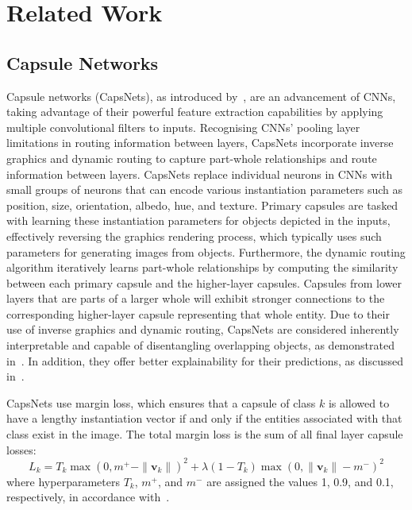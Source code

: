 \section{Related Work}
\label{sec2}

\subsection{Capsule Networks}
Capsule networks (CapsNets), as introduced by~\cite{sabour-2017}, are an advancement of CNNs, taking advantage of their powerful feature extraction capabilities by applying multiple convolutional filters to inputs. Recognising CNNs' pooling layer limitations in routing information between layers, CapsNets incorporate inverse graphics and dynamic routing to capture part-whole relationships and route information between layers. CapsNets replace individual neurons in CNNs with small groups of neurons that can encode various instantiation parameters such as position, size, orientation, albedo, hue, and texture. Primary capsules are tasked with learning these instantiation parameters for objects depicted in the inputs, effectively reversing the graphics rendering process, which typically uses such parameters for generating images from objects. Furthermore, the dynamic routing algorithm iteratively learns part-whole relationships by computing the similarity between each primary capsule and the higher-layer capsules. Capsules from lower layers that are parts of a larger whole will exhibit stronger connections to the corresponding higher-layer capsule representing that whole entity. Due to their use of inverse graphics and dynamic routing, CapsNets are considered inherently interpretable and capable of disentangling overlapping objects, as demonstrated in~\cite{sabour-2017}. In addition, they offer better explainability for their predictions, as discussed in~\cite{lalonde-2020a}.

CapsNets use margin loss, which ensures that a capsule of class $k$ is allowed to have a lengthy instantiation vector if and only if the entities associated with that class exist in the image. The total margin loss is the sum of all final layer capsule losses:
\begin{equation}
L_k = T_k \max(0, m^{+} - \|\mathbf{v}_k\|)^2 + \lambda (1 - T_k) \max(0, \|\mathbf{v}_k\| - m^{-})^2
\label{eq_margin_loss}
\end{equation}
where hyperparameters $T_k$, $m^+$, and $m^-$ are assigned the values 1, 0.9, and 0.1, respectively, in accordance with~\cite{sabour-2017}.

